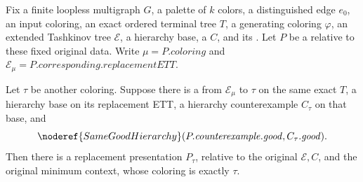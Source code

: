 \begin{lemma}
Fix a finite loopless multigraph \(G\), a palette of \(k\) colors, a
distinguished edge \(e_0\), an input coloring, an exact ordered terminal
tree \(T\), a generating coloring \(\varphi\), an extended Tashkinov tree
\(\mathcal E\), a hierarchy base, a
 \(C\), and its
.  Let
\(P\) be a  relative to these
fixed original data.  Write \(\mu=P.\mathit{coloring}\) and
\(\mathcal E_\mu=P.\mathit{corresponding}.\mathit{replacementETT}\).

Let \(\tau\) be another coloring.  Suppose there is a
 from \(\mathcal E_\mu\) to
\(\tau\) on the same exact \(T\), a hierarchy base on its replacement ETT,
a hierarchy counterexample \(C_\tau\) on that base, and
\[
 \noderef{SameGoodHierarchy}
   (P.\mathit{counterexample}.\mathit{good},C_\tau.\mathit{good}).
\]
Then there is a replacement presentation \(P_\tau\), relative to the
original \(\mathcal E,C\), and the original minimum context, whose coloring
is exactly \(\tau\).
\end{lemma}
